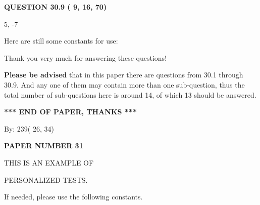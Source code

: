 \documentclass[12pt]{article}
\begin{document}
 
 
 
  
\vspace{0.2in}
  
{\textbf{\Large{QUESTION
30.9 
 (          9,         16,         70)
}}}
  
  


 
 
\noindent{}

5,  %
-7
 
 
 
   
   
 \vspace{0.2in}
Here are still some constants for use:
 
 
 
 
Thank you very much for answering these questions!
 
{\textbf{\large{Please be advised}}} that in this paper there are questions from
30.1 through
30.9.
And any one of them may contain more than one sub-question, thus the total number
of sub-questions here is around 14, of which
13 should be answered.
 
   
   
   
   
\vspace{1.0in} 
{\textbf{\large{ *** END OF PAPER, THANKS *** }}} 
   
   
\hspace{1.0in} By: 
         239(         26,          34)
   
   
   
   
\newpage 
\setcounter{page}{ 
    31001 } 
   
   
   
   
 {\textbf{ \Large{ PAPER NUMBER          31 }}}
   
   
\vspace{0.2in}
   
   
   
   
   
   
 \vspace{0.2in}
 
 
{\Huge  THIS IS AN EXAMPLE OF}
 
{\Huge  PERSONALIZED TESTS. }
 
If needed, please use the following constants.
 
 
 
\end{document}

